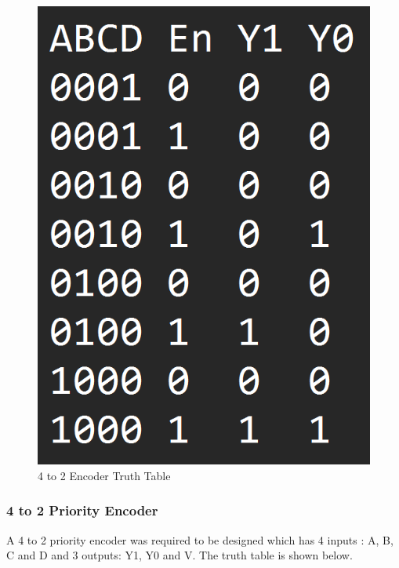 \documentclass[12pt]{article}
\begin{document}
\begin{figure}[H]
\centering
  \includegraphics[scale=0.3]{Images/4to2TT.png}
  \caption{4 to 2 Encoder Truth Table}
\end{figure}

\subsubsection{4 to 2 Priority Encoder}
A 4 to 2 priority encoder was required to be designed which has 4 inputs : A, B, C and D and 3 outputs: Y1, Y0 and V. The truth table is shown below.
\end{document}
